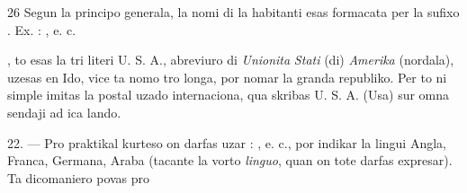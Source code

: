 \begin{VUpage}[30]{26}
Segun la principo generala, la nomi di la habitanti esas\nl
formacata per la sufixo . Ex. : \cc
{}\nl
{}, e. c.

, to esas la tri literi U. S. A., abreviuro di \textit{Unionita}\nl
\textit{Stati} (di) \textit{Amerika} (nordala), uzesas en Ido, vice ta nomo\nl
tro longa, por nomar la granda republiko. Per to ni simple\nl
imitas la postal uzado internaciona, qua skribas U. S. A.\nl
(Usa) sur omna sendaji ad ica lando.

\VUblanc{4.67pt}%
22. --- Pro praktikal kurteso on darfas uzar : \nl
{}, e. c., por indikar la lingui\nl
Angla, Franca, Germana, Araba (tacante la vorto \textit{linguo},\nl
quan on tote darfas expresar). Ta dicomaniero povas pro
\parplein
\end{VUpage}

